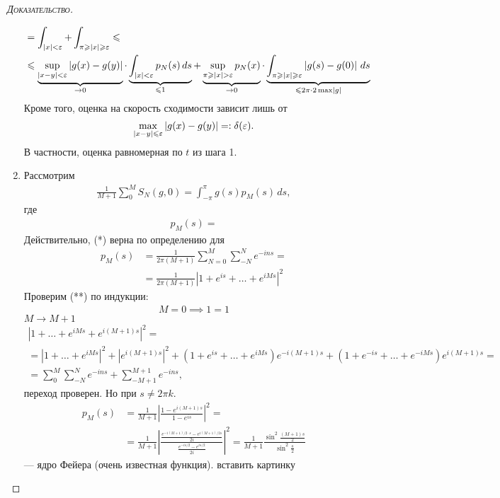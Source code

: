 \documentclass[../complex-analysis.tex]{subfiles}
\begin{document}
\begin{proof}[\normalfont\textsc{Доказательство}]
\begin{enumerate}
\begin{align*}
    &= \int_{\left| x \right| < \varepsilon}   + \int_{\pi \geqslant \left| x \right| \geqslant \varepsilon}  \leqslant \\
    &\leqslant \underbrace{\sup_{\left| x-y \right| < \varepsilon} \left| g(x)-g(y) \right|}_{\to 0} \cdot \underbrace{\int_{\left| x \right| < \varepsilon}   p_N(s)\,ds}_{\leqslant 1} + \underbrace{\sup_{\pi \geqslant \left| x \right| > \varepsilon} p_N(x)}_{\to 0} \cdot \underbrace{\int_{\pi \geqslant \left| x \right|\geqslant \varepsilon}  \left| g(s)-g(0) \right|\,ds}_{\leqslant 2\pi \cdot 2 \max \left| g \right|}
   \end{align*}Кроме того, оценка на скорость сходимости зависит лишь от
 \begin{align*}
  \max_{\left| x-y \right| \leqslant \varepsilon} \left| g(x)-g(y) \right| =: \delta(\varepsilon).
 \end{align*} В частности, оценка равномерная по $ t $ из шага 1.

\item Рассмотрим 
 \begin{align*}
  \frac{1}{M+1}\sum_{0}^{M} S_N(g,0) = \int_{-\pi}^{\pi}g(s)p_M(s)\,ds,
 \end{align*} где
 \begin{align*}
  p_M(s) = 
 \end{align*} Действительно, (*) верна по определению для
 \begin{align*}
  p_M(s) &= \frac{1}{2\pi (M+1)} \sum_{N=0}^{M} \sum_{-N}^{N} e^{-ins} = \\
  &= \frac{1}{2\pi (M+1)} \left| 1 + e^{is} + \ldots + e^{iMs} \right|^{2}
 \end{align*} Проверим (**) по индукции:
 \begin{align*}
  M = 0 \implies 1 = 1
 \end{align*} $ M \to M +1 $
 \begin{align*}
  \left| 1+\ldots+e^{iMs} + e^{i(M+1)s} \right|^{2} = \\
  = \left| 1+\ldots+e^{iMs} \right|^{2} + \left| e^{i(M+1)s} \right|^{2} + (1+e^{is}+ \ldots + e^{iMs})e^{-i(M+1)s} + (1 + e^{-is} + \ldots + e^{-iMs})e^{i(M+1)s} = \\
  = \sum_{0}^{M} \sum_{-N}^{N}e^{-ins} + \sum_{-M+1}^{M+1} e^{-ins},
 \end{align*} переход проверен. Но при $ s \neq 2\pi k $.
 \begin{align*}
  p_M(s) &= \frac{1}{M+1} \left| \frac{1-e^{i(M+1)s}}{1-e^{is}} \right|^{2} = \\
  &= \frac{1}{M+1}  \left|\frac{\frac{e^{-i(M+1) / 2 \cdot s} - e^{i(M+1) / 2s}}{2i}}{\frac{e^{-is / 2} - e^{is / 2}}{2i}} \right|^{2} = \frac{1}{M+1} \frac{ \sin^{2} \frac{(M+1)s}{2}}{\sin^{2} \frac{s}{2}}
 \end{align*} --- ядро Фейера (очень известная функция). {\color{red} вставить картинку}


\end{enumerate}
\end{proof}
\end{document}
